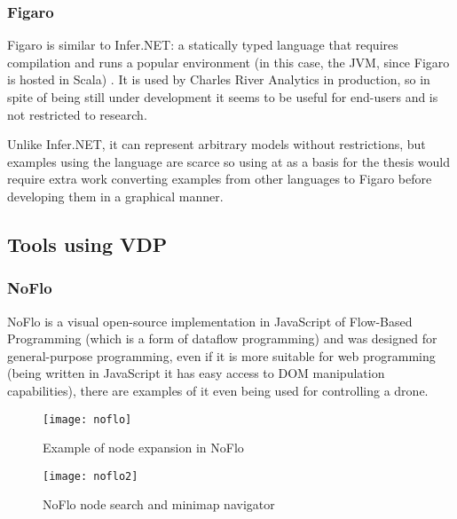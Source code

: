 \begin{itemsize}
\subsubsection{Figaro}

Figaro is similar to Infer.NET: a statically typed language that requires compilation
and runs a popular environment (in this case, the JVM, since Figaro is hosted in
Scala) \cite{figarot}. It is used by Charles River Analytics in production, so
in spite of being still under development it seems to be useful for end-users and
is not restricted to research.

Unlike Infer.NET, it can represent arbitrary models without restrictions, but
examples using the language are scarce so using at as a basis for the thesis
would require extra work converting examples from other languages to Figaro
before developing them in a graphical manner.

\subsection{Tools using VDP}
\label{sec:sotavdp}

\subsubsection{NoFlo}
\label{sec:noflo}

NoFlo is a visual open-source implementation in JavaScript of Flow-Based Programming \cite{noflo}
(which is a form of dataflow programming) and was designed for general-purpose
programming, even if it is more suitable for web programming (being written in
JavaScript it has easy access to DOM manipulation capabilities), there are
examples of it even being used for controlling a drone.

\begin{figure}[t]
  \begin{center}
    \leavevmode
    \texttt{[image: noflo]}
    \caption{Example of node expansion in NoFlo \cite{noflo}}
    \label{fig:noflo}
  \end{center}
\end{figure}

\begin{figure}[t]
  \begin{center}
    \leavevmode
    \texttt{[image: noflo2]}
    \caption{NoFlo node search and minimap navigator \cite{noflo}}
    \label{fig:noflo2}
  \end{center}
\end{figure}


\end{itemsize}
